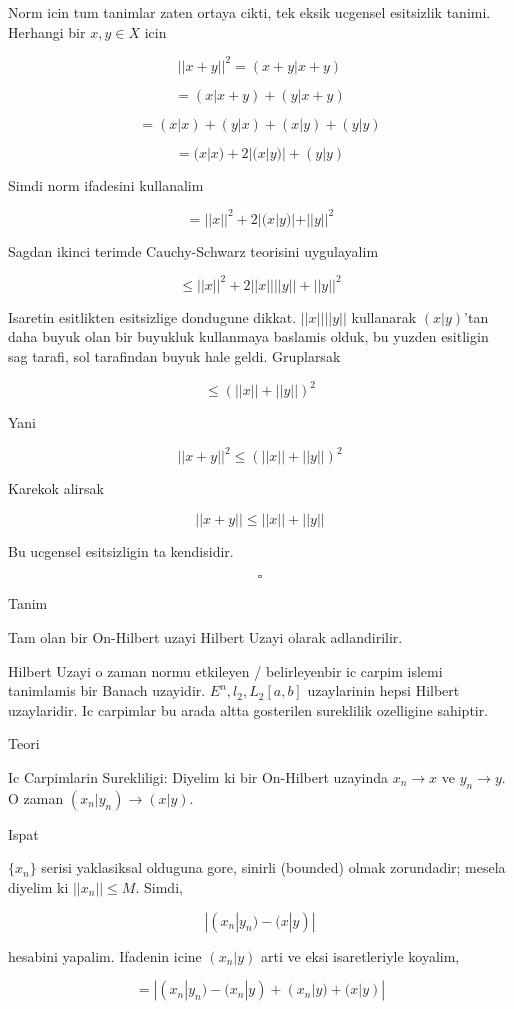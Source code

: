 \documentclass[12pt,fleqn]{article}\usepackage{../common}
\begin{document}
Norm icin tum tanimlar zaten ortaya cikti, tek eksik ucgensel esitsizlik
tanimi. Herhangi bir $x,y \in X$ icin 

\[ ||x+y||^2 = (x+y|x+y) \]

\[ = (x|x+y) + (y|x+y) \]

\[ = (x|x) + (y|x) + (x|y) + (y|y) \]

\[ = (x|x) + 2|(x|y)| + (y|y) \]

Simdi norm ifadesini kullanalim

\[ = ||x||^2 + 2|(x|y)| + ||y||^2 \]

Sagdan ikinci terimde  Cauchy-Schwarz teorisini uygulayalim

\[ \le ||x||^2 + 2||x||||y|| + ||y||^2 \]

Isaretin esitlikten esitsizlige dondugune dikkat. $||x||||y||$ kullanarak
$(x|y)$'tan daha buyuk olan bir buyukluk kullanmaya baslamis olduk, bu
yuzden esitligin sag tarafi, sol tarafindan buyuk hale geldi. Gruplarsak

\[ \le (||x||+||y||)^2  \]

Yani

\[ ||x+y||^2 \le (||x||+||y||)^2  \]

Karekok alirsak 

\[ ||x+y|| \le ||x||+||y||  \]

Bu ucgensel esitsizligin ta kendisidir. 

\[ \square \]

Tanim 

Tam olan bir On-Hilbert uzayi Hilbert Uzayi olarak adlandirilir. 

Hilbert Uzayi o zaman normu etkileyen / belirleyenbir ic carpim islemi
tanimlamis bir Banach uzayidir. $E^n,l_2,L_2[a,b]$ uzaylarinin hepsi
Hilbert uzaylaridir. Ic carpimlar bu arada altta gosterilen sureklilik
ozelligine sahiptir.

Teori 

Ic Carpimlarin Surekliligi: Diyelim ki bir On-Hilbert uzayinda $x_n \to x$
ve $y_n \to y$. O zaman $(x_n|y_n) \to (x|y)$.

Ispat

$\{x_n\}$ serisi yaklasiksal olduguna gore, sinirli (bounded) olmak
zorundadir; mesela diyelim ki $||x_n|| \le M$. Simdi,

\[ |(x_n|y_n) - (x|y)| \]

hesabini yapalim. Ifadenin icine $(x_n|y)$ arti ve eksi isaretleriyle
koyalim, 

\[ = |(x_n|y_n) - (x_n|y) + (x_n|y) + (x|y)| \]
\end{document}
